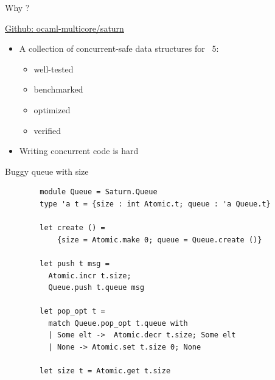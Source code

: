 \begin{frame}{Why \Saturn ?}
    \hfill\small{\href{https://github.com/ocaml-multicore/saturn}{Github: ocaml-multicore/saturn}
\vfill
    \begin{itemize}[label=$\bullet$]
        \item A collection of concurrent-safe data structures for \OCaml~5: 
        \begin{itemize}[label=$\diamond$]
            \item well-tested
            \item benchmarked
            \item optimized
            \item verified
        \end{itemize}
        \item<2-> Writing concurrent code is hard 
    \end{itemize}
    }
    \vfill
\end{frame}





\begin{frame}[fragile]{Buggy queue with size}     
    \begin{lstlisting}
        module Queue = Saturn.Queue 
        type 'a t = {size : int Atomic.t; queue : 'a Queue.t}

        let create () = 
            {size = Atomic.make 0; queue = Queue.create ()}
        
        let push t msg =
          Atomic.incr t.size;
          Queue.push t.queue msg
        
        let pop_opt t =
          match Queue.pop_opt t.queue with
          | Some elt ->  Atomic.decr t.size; Some elt
          | None -> Atomic.set t.size 0; None
        
        let size t = Atomic.get t.size
    \end{lstlisting}
\end{frame}


